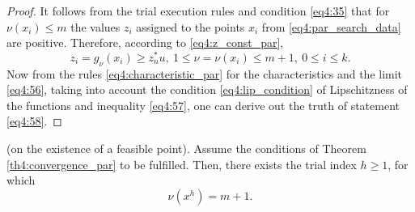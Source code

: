 \begin{proof}
  It follows from the trial execution rules and condition \eqref{eq4:35} that for $\nu(x_i )\le m$ the values $z_i$ assigned to the points $x_i$ from \eqref{eq4:par_search_data} are positive. Therefore, according to \eqref{eq4:z_const_par},
  \begin{displaymath}
    z_i=g_\nu(x_i)\ge z^*_nu,\:1\le\nu=\nu(x_i)\le m+1,\: 0\le i\le k.
  \end{displaymath}
    Now from the rules \eqref{eq4:characteristic_par} for the characteristics and the limit \eqref{eq4:56}, taking into account the condition \eqref{eq4:lip_condition} of Lipschitzness of the functions and inequality \eqref{eq4:57}, one can derive out the truth of statement \eqref{eq4:58}.
\end{proof}
\begin{lemma}
  \label{lm4:2}
  (on the existence of a feasible point). Assume the conditions of Theorem \ref{th4:convergence_par} to be fulfilled. Then, there exists the trial index $h\ge 1$, for which
  \begin{equation}
    \label{eq4:62}
    \nu(x^h)=m+1.
  \end{equation}
\end{lemma}
